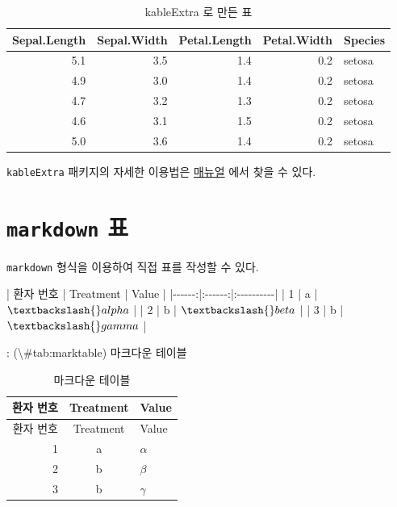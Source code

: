 \documentclass[
]{book}
\newenvironment{Shaded}{\begin{snugshade}}{\end{snugshade}}
\newcommand{\NormalTok}[1]{#1}
\newcommand{\SpecialCharTok}[1]{\textcolor[rgb]{0.00,0.00,0.00}{#1}}
\theoremstyle{definition}
\theoremstyle{definition}
\theoremstyle{definition}
\theoremstyle{definition}
\theoremstyle{remark}
\begin{document}
\begin{table}

\caption{\label{tab:tbl2}kableExtra 로 만든 표}
\centering
\fontsize{11}{13}\selectfont
\begin{tabular}[t]{r|r|r|r|l}
\hline
Sepal.Length & Sepal.Width & Petal.Length & Petal.Width & Species\\
\hline
5.1 & 3.5 & 1.4 & 0.2 & setosa\\
\hline
4.9 & 3.0 & 1.4 & 0.2 & setosa\\
\hline
4.7 & 3.2 & 1.3 & 0.2 & setosa\\
\hline
4.6 & 3.1 & 1.5 & 0.2 & setosa\\
\hline
5.0 & 3.6 & 1.4 & 0.2 & setosa\\
\hline
\end{tabular}
\end{table}

\texttt{kableExtra} 패키지의 자세한 이용법은 \href{https://cran.r-project.org/web/packages/kableExtra/vignettes/awesome_table_in_html.html}{매뉴얼} 에서 찾을 수 있다.

\hypertarget{markdown-uxd45c}{%
\section{\texorpdfstring{\texttt{markdown} 표}{markdown 표}}\label{markdown-uxd45c}}

\texttt{markdown} 형식을 이용하여 직접 표를 작성할 수 있다.

\begin{Shaded}
\begin{Highlighting}[]
\NormalTok{| 환자 번호  | Treatment  | Value |}
\NormalTok{|{-}{-}{-}{-}{-}{-}:|:{-}{-}{-}{-}{-}{-}:|:{-}{-}{-}{-}{-}{-}{-}{-}{-}{-}|}
\NormalTok{|   1   |   a    | $\textbackslash{}alpha$  |}
\NormalTok{|   2   |   b    | $\textbackslash{}beta$   |}
\NormalTok{|   3   |   b    | $\textbackslash{}gamma$  |}


\NormalTok{: (}\SpecialCharTok{\textbackslash{}\#}\NormalTok{tab:marktable) 마크다운 테이블 }
\end{Highlighting}
\end{Shaded}

\begin{longtable}[]{@{}rcl@{}}
\caption{\label{tab:marktable} 마크다운 테이블}\tabularnewline
\toprule
환자 번호 & Treatment & Value\tabularnewline
\midrule
\endfirsthead
\toprule
환자 번호 & Treatment & Value\tabularnewline
\midrule
\endhead
1 & a & \(\alpha\)\tabularnewline
2 & b & \(\beta\)\tabularnewline
3 & b & \(\gamma\)\tabularnewline
\bottomrule
\end{longtable}
\end{document}

